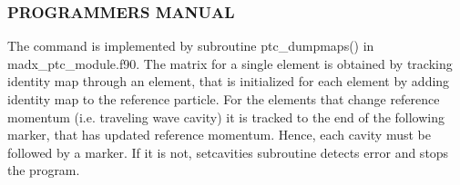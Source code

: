 


\subsubsection{ PROGRAMMERS MANUAL }   The command is implemented by subroutine ptc\_dumpmaps() in madx\_ptc\_module.f90. The matrix for a single element is obtained by tracking identity map through an element, that is initialized for each element by adding identity map to the reference particle. For the elements that change reference momentum (i.e. traveling wave cavity)  it is tracked to the end of the following marker, that has updated reference momentum. Hence, each cavity must be followed by a marker. If it is not, setcavities subroutine detects error and stops the program.  


